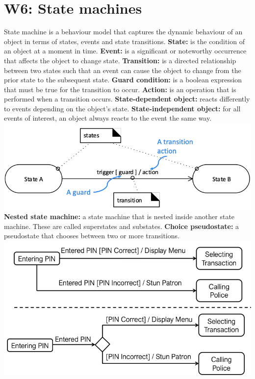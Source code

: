 \section{W6: State machines}
State machine is a behaviour model that captures the dynamic behaviour of an object in terms of states, events and state transitions.
\textbf{State:} is the condition of an object at a moment in time.
\textbf{Event:} is a significant or noteworthy occurrence that affects the object to change state.
\textbf{Transition:} is a directed relationship between two states such that an event can cause the object to change from the prior state to the subsequent state.
\textbf{Guard condition:} is a boolean expression that must be true for the transition to occur.
\textbf{Action:} is an operation that is performed when a transition occurs.
\textbf{State-dependent object:} reacts differently to events depending on the object's state.
\textbf{State-independent object:} for all events of interest, an object always reacts to the event the same way.
\includegraphics[width=\linewidth]{figs/state-machine.png}
\textbf{Nested state machine:} a state machine that is nested inside another state machine. These are called superstates and substates.
\textbf{Choice pseudostate:} a pseudostate that chooses between two or more transitions.
\includegraphics[width=\linewidth]{figs/choice-pseudostate.png}
